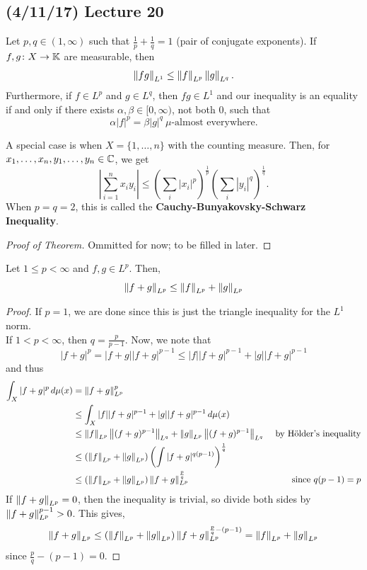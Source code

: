 \documentclass[11pt,leqno,oneside]{amsbook}
\numberwithin{thm}{section}
\newcommand{\K}{\mathbb{K}} %
\renewcommand{\de}{\textbf} %
\begin{document}
\subsection*{(4/11/17) Lecture 20}
\begin{thm}
  Let \(p,q \in (1,\infty)\) such that \(\frac{1}{p}+\frac{1}{q} = 1\)
  (pair of conjugate exponents). If \(f,g \from X \to \K\) are
  measurable, then \[
    \norm[fg]_{L^1} \leq \norm[f]_{L^p} \norm[g]_{L^q}.
  \]
  Furthermore, if \(f \in L^p\) and \(g \in L^q\), then \(fg \in L^1\)
  and our inequality is an equality if and only if there exists
  \(\alpha,\beta \in [0,\infty)\), not both 0, such that \[
    \alpha|f|^p = \beta |g|^q\ \mu\text{-almost everywhere.}
  \]
\end{thm}
\begin{rmk}
  A special case is when \(X = \{1,\ldots,n\}\) with the counting
  measure. Then, for \(x_1, \ldots, x_n, y_1, \ldots, y_n \in \C\), we
  get \[
    \left| \sum_{i=1}^n x_i y_i \right| \leq \left( \sum_i |x_i|^p
    \right)^\frac{1}{p} \left( \sum_i |y_i|^q\right)^\frac{1}{q}.
  \]
  When \(p=q=2\), this is called the \de{Cauchy-Bunyakovsky-Schwarz
    Inequality}.
\end{rmk}
\begin{proof}[Proof of Theorem]
  Ommitted for now; to be filled in later.
\end{proof}
\begin{thm}
  Let \(1 \leq p < \infty\) and \(f,g \in L^p\). Then, \[
    \norm[f+g]_{L^p} \leq \norm[f]_{L^p} + \norm[g]_{L^p}
  \]
\end{thm}
\begin{proof}
  If \(p=1\), we are done since this is just the triangle inequality
  for the \(L^1\) norm. \\

  If \(1 < p < \infty\), then \(q = \frac{p}{p-1}\). Now, we note
  that \[
    |f+g|^p = |f+g||f+g|^{p-1} \leq |f||f+g|^{p-1} + |g||f+g|^{p-1}
  \]
  and thus
  \begin{align*}
    \int_X |f+g|^p \d\mu(x) & = \norm[f+g]_{L^p}^p\\
    & \leq \int_X |f||f+g|^{p-1} + |g||f+g|^{p-1} \d\mu(x) \\
    & \leq \norm[f]_{L^p} \norm[(f+g)^{p-1}]_{L^q} +
      \norm[g]_{L^p}\norm[(f+g)^{p-1}]_{L^q} & \text{ by H\"{o}lder's
                                               inequality} \\
    & \leq \left( \norm[f]_{L^p} + \norm[g]_{L^p} \right) \left( \int
      |f+g|^{q(p-1)} \right)^\frac{1}{q} \\
    & \leq \left( \norm[f]_{L^p} + \norm[g]_{L^p} \right)
      \norm[f+g]_{L^p}^\frac{p}{q} & \text{ since }q(p-1) = p
  \end{align*}
  If \(\norm[f+g]_{L^p} = 0\), then the inequality is trivial, so divide
  both sides by \(\norm[f+g]_{L^p}^{p-1} > 0\). This gives, \[
    \norm[f+g]_{L^p} \leq (\norm[f]_{L^p} + \norm[g]_{L^p})
    \norm[f+g]_{L^p}^{\frac{p}{q}-(p-1)} = \norm[f]_{L^p} + \norm[g]_{L^p}
  \]
  since \(\frac{p}{q}-(p-1) = 0\).
\end{proof}
\end{document}
